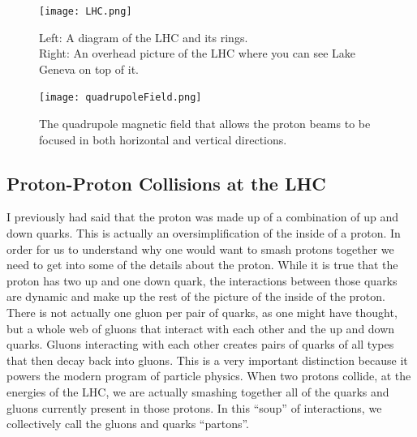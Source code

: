 \begin{figure} %
    \centering
    \texttt{[image: LHC.png]}
    \caption{Left: A diagram of the LHC and its rings.\\ Right: An overhead picture of the LHC where you can see Lake Geneva on top of it.}
    \label{fig:fig_3-1}
 \end{figure}

 \begin{figure} %
    \centering
    \texttt{[image: quadrupoleField.png]}
    \caption{The quadrupole magnetic field that allows the proton beams to be focused in both horizontal and vertical directions.}
    \label{fig:fig_3-2}
 \end{figure}


\subsection{Proton-Proton Collisions at the LHC}
I previously had said that the proton was made up of a combination of up and down quarks. This is actually an oversimplification of the inside of a proton.
In order for us to understand why one would want to smash protons together we need to get into some of the details about the proton.
While it is true that the proton has two up and one down quark, the interactions between those quarks are dynamic and make up the rest of the picture of the inside of the proton.
There is not actually one gluon per pair of quarks, as one might have thought, but a whole web of gluons that interact with each other and the up and down quarks.
Gluons interacting with each other creates pairs of quarks of all types that then decay back into gluons. 
This is a very important distinction because it powers the modern program of particle physics.
When two protons collide, at the energies of the LHC, we are actually smashing together all of the quarks and gluons currently present in those protons.
In this ``soup'' of interactions, we collectively call the gluons and quarks ``partons''.

